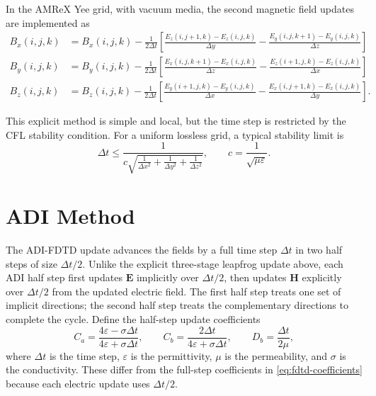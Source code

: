 \documentclass{article}
\numberwithin{equation}{section}
\numberwithin{figure}{section}
\begin{document}
In the AMReX Yee grid, with vacuum media, the second magnetic field updates are implemented as
\begin{subequations}\label{eq:fdtd-second-h-half-amrex}
    \begin{align}
        B_x(i,j,k) & = B_x(i,j,k) - \frac{1}{2\Delta t} \left[\frac{E_z(i,j+1,k)-E_z(i,j,k)}{\Delta y} - \frac{E_y(i,j,k+1)-E_y(i,j,k)}{\Delta z}\right]  \\
        B_y(i,j,k) & = B_y(i,j,k) - \frac{1}{2\Delta t} \left[\frac{E_x(i,j,k+1)-E_x(i,j,k)}{\Delta z} - \frac{E_z(i+1,j,k)-E_z(i,j,k)}{\Delta x}\right]  \\
        B_z(i,j,k) & = B_z(i,j,k) - \frac{1}{2\Delta t} \left[\frac{E_y(i+1,j,k)-E_y(i,j,k)}{\Delta x} - \frac{E_x(i,j+1,k)-E_x(i,j,k)}{\Delta y}\right].
    \end{align}
\end{subequations}

This explicit method is simple and local, but the time step is restricted by the CFL stability condition. For a uniform lossless grid, a typical stability limit is
\begin{equation}\label{eq:fdtd-cfl}
    \Delta t \le \frac{1}{c\sqrt{\frac{1}{\Delta x^2}+\frac{1}{\Delta y^2}+\frac{1}{\Delta z^2}}}, \qquad c = \frac{1}{\sqrt{\mu\varepsilon}}.
\end{equation}


\section{ADI Method}

The ADI-FDTD update advances the fields by a full time step $\Delta t$ in two half steps of size $\Delta t/2$. Unlike the explicit three-stage leapfrog update above, each ADI half step first updates $\mathbf{E}$ implicitly over $\Delta t/2$, then updates $\mathbf{H}$ explicitly over $\Delta t/2$ from the updated electric field. The first half step treats one set of implicit directions; the second half step treats the complementary directions to complete the cycle. Define the half-step update coefficients
\begin{equation}\label{eq:adi-half-coefficients}
    C_a = \frac{4\varepsilon-\sigma\Delta t}{4\varepsilon+\sigma\Delta t}, \qquad C_b = \frac{2\Delta t}{4\varepsilon+\sigma\Delta t}, \qquad D_b = \frac{\Delta t}{2\mu},
\end{equation}
where $\Delta t$ is the time step, $\varepsilon$ is the permittivity, $\mu$ is the permeability, and $\sigma$ is the conductivity. These differ from the full-step coefficients in \eqref{eq:fdtd-coefficients} because each electric update uses $\Delta t/2$.
\end{document}
